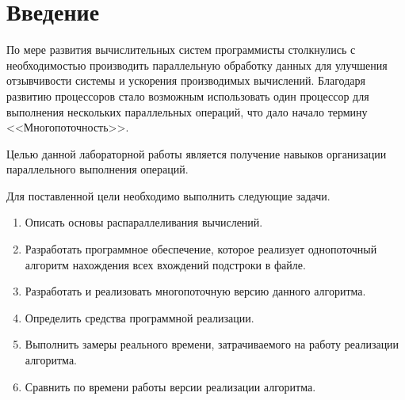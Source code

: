 \chapter*{Введение}

По мере развития вычислительных систем программисты столкнулись с необходимостью производить параллельную обработку данных для улучшения отзывчивости системы и ускорения производимых вычислений.
Благодаря развитию процессоров стало возможным использовать один процессор для выполнения нескольких параллельных операций, что дало начало термину <<Многопоточность>>.

Целью данной лабораторной работы является получение навыков организации параллельного выполнения операций.

Для поставленной цели необходимо выполнить следующие задачи.
\begin{enumerate}
	\item Описать основы распараллеливания вычислений.
	\item Разработать программное обеспечение, которое реализует однопоточный алгоритм нахождения всех вхождений подстроки в файле.
	\item Разработать и реализовать многопоточную версию данного алгоритма.
	\item Определить средства программной реализации.
	\item Выполнить замеры реального времени, затрачиваемого на работу реализации алгоритма.
	\item Сравнить по времени работы версии реализации алгоритма.
\end{enumerate}
